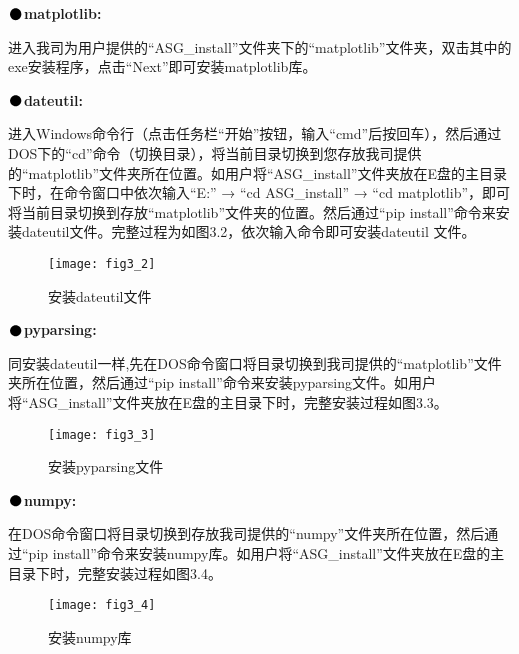 \noindent$\vcenter{\hbox{\huge$\bullet$}}$\quad\fontsize{12pt}{\baselineskip}\textbf{matplotlib:}

进入我司为用户提供的“ASG\_install”文件夹下的“matplotlib”文件夹，双击其中的exe安装程序，点击“Next”即可安装matplotlib库。%
\vspace{0.3cm}

\noindent$\vcenter{\hbox{\huge$\bullet$}}$\quad\fontsize{12pt}{\baselineskip}\textbf{dateutil:}

进入Windows命令行（点击任务栏“开始”按钮，输入“cmd”后按回车），然后通过DOS下的“cd”命令（切换目录），将当前目录切换到您存放我司提供的“matplotlib”文件夹所在位置。如用户将“ASG\_install”文件夹放在E盘的主目录下时，在命令窗口中依次输入“E:” → “cd ASG\_install” → “cd matplotlib”，即可将当前目录切换到存放“matplotlib”文件夹的位置。然后通过“pip install”命令来安装dateutil文件。完整过程为如图3.2，依次输入命令即可安装dateutil 文件。
\begin{figure}[ht]
\centering
\texttt{[image: fig3\_2]}
\caption{安装dateutil文件}
\end{figure}

\newpage
\noindent$\vcenter{\hbox{\huge$\bullet$}}$\quad\fontsize{12pt}{\baselineskip}\textbf{pyparsing:}

同安装dateutil一样,先在DOS命令窗口将目录切换到我司提供的“matplotlib”文件夹所在位置，然后通过“pip install”命令来安装pyparsing文件。如用户将“ASG\_install”文件夹放在E盘的主目录下时，完整安装过程如图3.3。


\begin{figure}[H]
\centering
\texttt{[image: fig3\_3]}
\caption{安装pyparsing文件}
\end{figure}

\noindent$\vcenter{\hbox{\huge$\bullet$}}$\quad\fontsize{12pt}{\baselineskip}\textbf{numpy:}

在DOS命令窗口将目录切换到存放我司提供的“numpy”文件夹所在位置，然后通过“pip install”命令来安装numpy库。如用户将“ASG\_install”文件夹放在E盘的主目录下时，完整安装过程如图3.4。
\begin{figure}[H]
\centering
\texttt{[image: fig3\_4]}
\caption{安装numpy库}
\end{figure}

